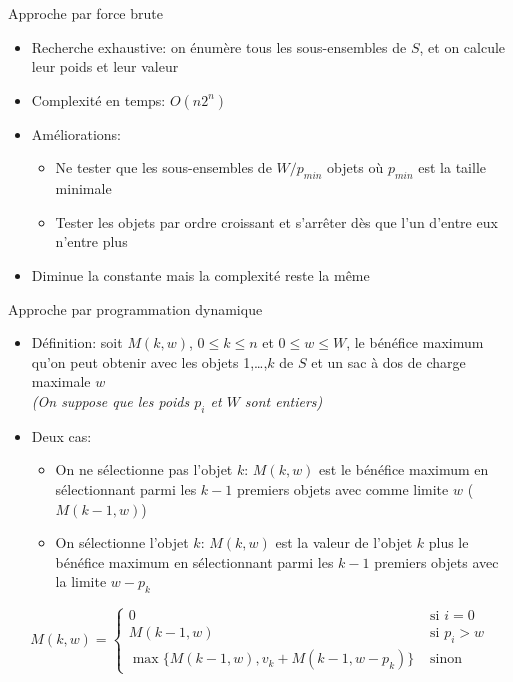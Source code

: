 \begin{frame}{Approche par force brute}

\begin{itemize}
\item Recherche exhaustive: on énumère tous les sous-ensembles de $S$, et on calcule leur poids et leur valeur
\item Complexité en temps: $O(n 2^n)$
\item Améliorations:
\begin{itemize}
\item Ne tester que les sous-ensembles de $W/p_{min}$ objets où
  $p_{min}$ est la taille minimale
\item Tester les objets par ordre croissant et s'arrêter dès que l'un
  d'entre eux n'entre plus
\end{itemize}
\item Diminue la constante mais la complexité reste la même
\end{itemize}

\end{frame}

\begin{frame}{Approche par programmation dynamique}

\begin{itemize}
\item Définition: soit $M(k,w)$, $0\leq k\leq n$ et $0\leq w\leq W$, le bénéfice
  maximum qu'on peut obtenir avec les objets 1,\ldots,$k$ de $S$ et
  un sac à dos de charge maximale $w$\\
{\it (On suppose que les poids $p_i$ et $W$ sont entiers)}
\item Deux cas:
\begin{itemize}
\item On ne sélectionne pas l'objet $k$: $M(k,w)$ est le bénéfice maximum
  en sélectionnant parmi les $k-1$ premiers objets avec
  comme limite $w$ ($M(k-1,w)$)
\item On sélectionne l'objet $k$: $M(k,w)$ est la valeur de l'objet
  $k$ plus le bénéfice maximum en sélectionnant parmi les $k-1$
  premiers objets avec la limite $w-p_k$
\end{itemize}
\end{itemize}

\[M(k,w)=\left\{\begin{array}{ll}
0 & \mbox{ si }i=0\\
M(k-1,w) & \mbox{ si } p_i>w\\
\max\{M(k-1,w),v_k+M(k-1,w-p_k)\} &  \mbox{ sinon}
\end{array}
\right.
\]
\label{part6:knapsack}
\end{frame}

